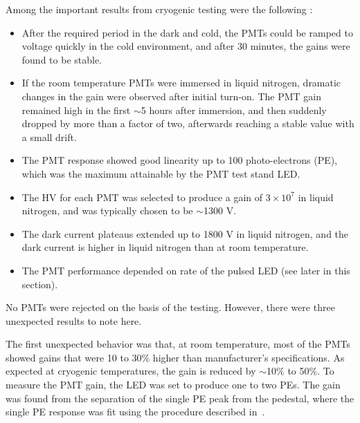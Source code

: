 Among the important results from cryogenic testing  were the following \cite{Briese:2013wua}:
\begin{itemize}
\item After the required period in the dark and cold, the PMTs could be ramped to voltage quickly in the cold environment, 
and after 30 minutes, the gains were found to be stable.
\item If the room temperature PMTs were immersed in liquid nitrogen, 
dramatic changes in the gain were observed after initial turn-on. 
The PMT gain remained high in the first $\sim$5 hours after immersion, 
and then suddenly dropped by more than a factor of two, 
afterwards reaching a stable value with a small drift.
\item The PMT response showed good linearity up to 100 photo-electrons (PE), 
which was the maximum attainable by the PMT test stand LED.  
\item The HV for each PMT was selected to produce a gain of $3\times 10^7$ in liquid nitrogen,
and was typically chosen to be $\sim$1300 V.
\item The dark current plateaus extended up to 1800 V in liquid nitrogen, and the dark current is higher in liquid nitrogen than at room temperature.
\item The PMT performance depended on rate of the pulsed LED (see later in this section).  
\end{itemize}
No PMTs were rejected on the basis of the testing.  
However, there were three unexpected results to note here.


The first unexpected behavior was that, at room temperature, 
most of the PMTs showed gains that were 10 to 30\% higher than manufacturer's specifications.
As expected at cryogenic temperatures, the gain is reduced by $\sim$10\% to 50\%.
To measure the PMT gain, the LED was set to produce one to two PEs.  
The gain was found from the separation of the single PE peak from the pedestal, where the single PE response was fit using the procedure described in~\cite{Bellamy:1994bv}.   


